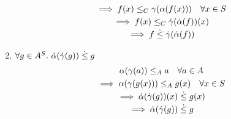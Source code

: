 \begin{exercise}
\begin{enumerate}[1.]
\begin{gather*}
            \implies f(x) \leq_C \gamma(\alpha(f(x))) \quad \forall x \in S \\
            \implies f(x) \leq_C \dot{\gamma}(\dot{\alpha}(f))(x) \\
            \implies f \mathrel{\dot{\leq}} \dot{\gamma}(\dot{\alpha}(f))
        \end{gather*}
        \item $\forall g \in A^S.\ \dotalpha(\dotgamma(g)) \dotleq g$
        \begin{gather*}
            \alpha(\gamma(a)) \leq_A a \quad \forall a \in A \\
            \implies \alpha(\gamma(g(x))) \leq_A g(x) \quad \forall x \in S \\
            \implies \dot{\alpha}(\dot{\gamma}(g))(x) \mathrel{\dot{\leq}} g(x) \\
            \implies \dot{\alpha}(\dot{\gamma}(g)) \mathrel{\dot{\leq}} g
        \end{gather*}
    \end{enumerate}
\end{exercise}
